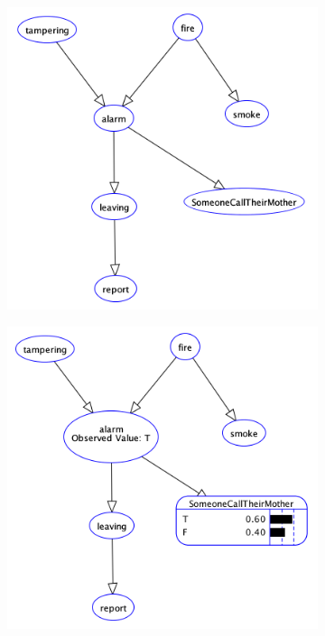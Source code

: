\documentclass{article}
\begin{document}
\begin{center}
\begin{figure}
\centering  
        \begin{subfigure}[b]{0.48\textwidth}
                \centering
                \includegraphics[width=\linewidth]{fig4}
        \end{subfigure}\hfill
        \begin{subfigure}[b]{0.48\textwidth}
                \centering
                \includegraphics[width=\linewidth]{fig5}
        \end{subfigure}
        \label{fig:4}
\end{figure}
\end{center}		
\end{document}
